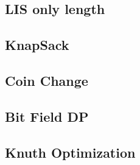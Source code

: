 \documentclass[10pt,landscape,a4paper,twocolumn]{article}
\begin{document}
\subsection{LIS only length}


\subsection{KnapSack}


\subsection{Coin Change}


\subsection{Bit Field DP}


\subsection{Knuth Optimization}

\end{document}
